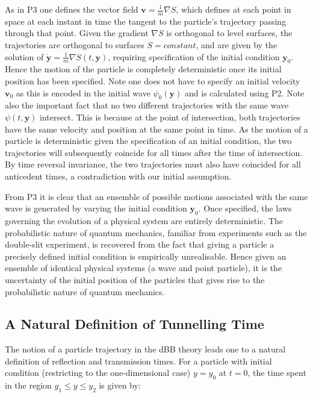 \documentclass{article}
\begin{document}
\noindent As in P3 one defines the vector field $\boldsymbol{v} = \frac{1}{m}\nabla S$, which defines at each point in space at each instant in time the tangent to the particle's trajectory passing through that point. Given the gradient $\nabla S$ is orthogonal to level surfaces, the trajectories are orthogonal to surfaces $S=constant$, and are given by the solution of $\dot{\boldsymbol{y}}=\frac{1}{m}\nabla S(t,\boldsymbol{y})$, requiring specification of the initial condition $\boldsymbol{y}_0$. Hence the motion of the particle is completely deterministic once its initial position has been specified. Note one does not have to specify an initial velocity $\boldsymbol{v}_0$ as this is encoded in the initial wave $\psi_0(\boldsymbol{y})$ and is calculated using P2. Note also the important fact that no two different trajectories with the same wave $\psi(t,\boldsymbol{y})$ intersect. This is because at the point of intersection, both trajectories have the same velocity and position at the same point in time. As the motion of a particle is deterministic given the specification of an initial condition, the two trajectories will subsequently coincide for all times after the time of intersection. By time reversal invariance, the two trajectories must also have coincided for all anticedent times, a contradiction with our initial assumption.

From P3 it is clear that an ensemble of possible motions associated with the same wave is generated by varying the initial condition $\boldsymbol{y}_0$. Once specified, the laws governing the evolution of a physical system are entirely deterministic. The probabilistic nature of quantum mechanics, familiar from experiments such as the double-slit experiment, is recovered from the fact that giving a particle a precisely defined initial condition is empirically unrealisable. Hence given an ensemble of identical physical systems (a wave and point particle), it is the uncertainty of the initial position of the particles that gives rise to the probabilistic nature of quantum mechanics. 

\subsection{A Natural Definition of Tunnelling Time}
\label{subsection:dBBtime}

The notion of a particle trajectory in the dBB theory leads one to a natural definition of reflection and transmission times. For a particle with initial condition (restricting to the one-dimensional case) $y=y_0$ at $t=0$, the time spent in the region $y_1 \leq y \leq y_2$ is given by:
\end{document}
